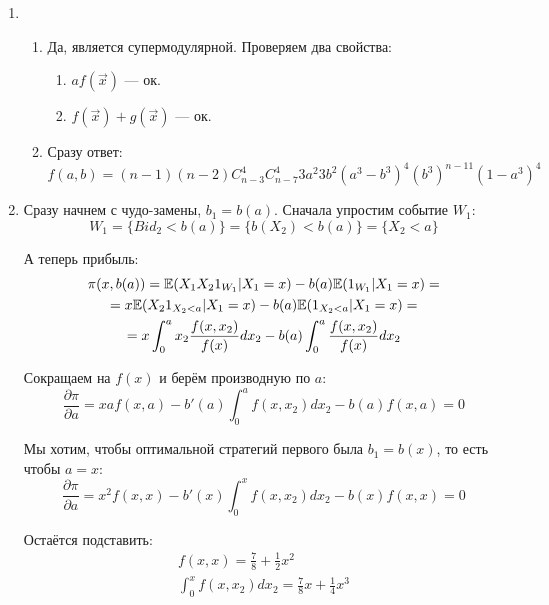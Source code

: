 \begin{enumerate}

\item
\begin{enumerate}
\item Да, является супермодулярной. Проверяем два свойства:
\begin{enumerate}
\item $ af(\vec{x}) $ — ок.
\item $ f(\vec{x})+g(\vec{x}) $ — ок.
\end{enumerate}

\item Сразу ответ: $ f(a,b)=(n-1)(n-2)C_{n-3}^{4}C_{n-7}^{4}3a^{2}3b^{2}(a^{3}-b^{3})^{4}(b^{3})^{n-11}(1-a^{3})^{4} $
\end{enumerate}


\item Сразу начнем с чудо-замены, $ b_{1}=b(a) $. Сначала упростим событие $ W_{1} $:
\begin{equation}
W_{1}=\{Bid_{2}<b(a)\}=\{b(X_{2})<b(a)\}=\{X_{2}<a\}
\end{equation}

А теперь прибыль:
\begin{multline}
\pi(x,b(a))=\mathbb{E}(X_{1}X_{2}1_{W_{1}}|X_{1}=x)-b(a)\mathbb{E}(1_{W_{1}}|X_{1}=x)=\\
=x\mathbb{E}(X_{2}1_{X_{2}<a}|X_{1}=x)-b(a)\mathbb{E}(1_{X_{2}<a}|X_{1}=x)=\\
=x\int_{0}^{a}x_{2}\frac{f(x,x_{2})}{f(x)}dx_{2}-b(a)\int_{0}^{a}\frac{f(x,x_{2})}{f(x)}dx_{2}
\end{multline}


Сокращаем на $ f(x) $ и берём производную по $ a $:
\begin{equation}
\frac{\partial \pi}{\partial a}=xaf(x,a)-b'(a)\int_{0}^{a}f(x,x_{2})dx_{2}-b(a)f(x,a)=0
\end{equation}


Мы хотим, чтобы оптимальной стратегий первого была $ b_{1}=b(x) $, то есть чтобы $ a=x $:
\begin{equation}
\frac{\partial \pi}{\partial a}=x^{2}f(x,x)-b'(x)\int_{0}^{x}f(x,x_{2})dx_{2}-b(x)f(x,x)=0
\end{equation}

Остаётся подставить:
\begin{equation}
\begin{array}{c}
f(x,x)=\frac{7}{8}+\frac{1}{2}x^{2} \\
\int_{0}^{x}f(x,x_{2})dx_{2}=\frac{7}{8}x+\frac{1}{4}x^{3}
\end{array}
\end{equation}



\end{enumerate}
